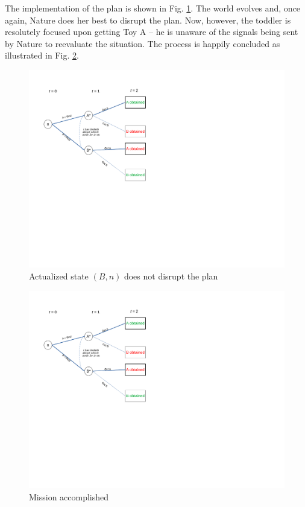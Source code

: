 \documentclass[
11pt,
titlepage,
reqno,
]{article}%
\theoremstyle{definition}
\begin{document}
The implementation of the plan is shown in Fig. \ref{Diag: p-12}. The world evolves and, once again, Nature does her best to disrupt the plan. Now, however, the toddler is resolutely focused upon getting Toy A -- he is unaware of the signals being sent by Nature to reevaluate the situation. The process is happily concluded as illustrated in Fig. \ref{Diag: p-13}.

\begin{figure}[h!]
	\centering
	\includegraphics*[page=12,trim = 0in 5in 3in 0in,scale=.65]{Awareness_Diagrams_All}
	\caption{Actualized state $(B,n)$ does not disrupt the plan\label{Diag: p-12}}%
\end{figure}

\begin{figure}[h!]
	\centering
	\includegraphics*[page=13,trim = 0in 5in 3in 0in,scale=.65]{Awareness_Diagrams_All}
	\caption{Mission accomplished\label{Diag: p-13}}%
\end{figure}
\end{document}
